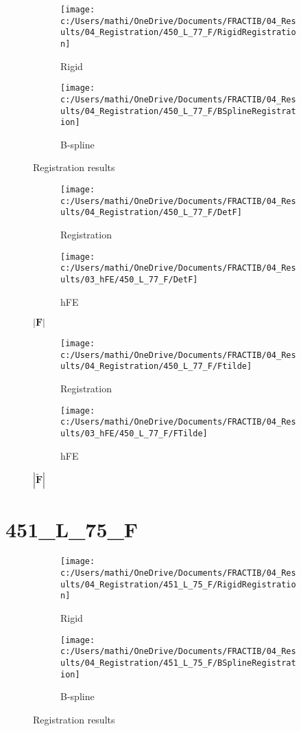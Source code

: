 \documentclass{article}%
\begin{document}
\begin{figure}[h!]%
\begin{subfigure}[b]{0.5\linewidth}%
\texttt{[image: c:/Users/mathi/OneDrive/Documents/FRACTIB/04\_Results/04\_Registration/450\_L\_77\_F/RigidRegistration]}%
\caption{Rigid}%
\end{subfigure}%
\begin{subfigure}[b]{0.5\linewidth}%
\texttt{[image: c:/Users/mathi/OneDrive/Documents/FRACTIB/04\_Results/04\_Registration/450\_L\_77\_F/BSplineRegistration]}%
\caption{B{-}spline}%
\end{subfigure}%
\caption{Registration results}%
\end{figure}

%


\begin{figure}[h!]%
\begin{subfigure}[b]{0.5\linewidth}%
\texttt{[image: c:/Users/mathi/OneDrive/Documents/FRACTIB/04\_Results/04\_Registration/450\_L\_77\_F/DetF]}%
\caption{Registration}%
\end{subfigure}%
\begin{subfigure}[b]{0.5\linewidth}%
\texttt{[image: c:/Users/mathi/OneDrive/Documents/FRACTIB/04\_Results/03\_hFE/450\_L\_77\_F/DetF]}%
\caption{hFE}%
\end{subfigure}%
\caption{$|\mathbf{F}|$}%
\end{figure}

%


\begin{figure}[h!]%
\begin{subfigure}[b]{0.5\linewidth}%
\texttt{[image: c:/Users/mathi/OneDrive/Documents/FRACTIB/04\_Results/04\_Registration/450\_L\_77\_F/Ftilde]}%
\caption{Registration}%
\end{subfigure}%
\begin{subfigure}[b]{0.5\linewidth}%
\texttt{[image: c:/Users/mathi/OneDrive/Documents/FRACTIB/04\_Results/03\_hFE/450\_L\_77\_F/FTilde]}%
\caption{hFE}%
\end{subfigure}%
\caption{$|\widetilde{\mathbf{F}}|$}%
\end{figure}

%
\newpage%
\section*{451\_L\_75\_F}%
\label{sec:451L75F}%


\begin{figure}[h!]%
\begin{subfigure}[b]{0.5\linewidth}%
\texttt{[image: c:/Users/mathi/OneDrive/Documents/FRACTIB/04\_Results/04\_Registration/451\_L\_75\_F/RigidRegistration]}%
\caption{Rigid}%
\end{subfigure}%
\begin{subfigure}[b]{0.5\linewidth}%
\texttt{[image: c:/Users/mathi/OneDrive/Documents/FRACTIB/04\_Results/04\_Registration/451\_L\_75\_F/BSplineRegistration]}%
\caption{B{-}spline}%
\end{subfigure}%
\caption{Registration results}%
\end{figure}
\end{document}

